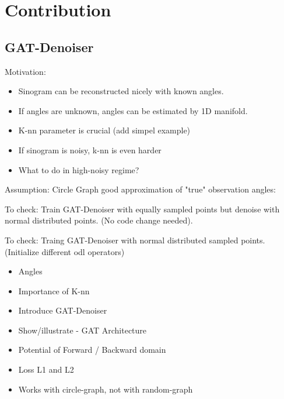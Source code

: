 \chapter{Contribution}
\label{sec:contribution}



\section{GAT-Denoiser}


Motivation:
\begin{itemize}
  \item Sinogram can be reconstructed nicely with known angles.
  \item If angles are unknown, angles can be estimated by 1D manifold.
  \item K-nn parameter is crucial (add simpel example)
  \item If sinogram is noisy, k-nn is even harder
  \item What to do in high-noisy regime?
\end{itemize}

Assumption:
Circle Graph good approximation of "true" observation angles:

To check:
Train GAT-Denoiser with equally sampled points but denoise with
normal distributed points.
(No code change needed).

To check:
Traing GAT-Denoiser with normal distributed sampled points.
(Initialize different odl operators)



\begin{itemize}
  \item Angles 
  \item Importance of K-nn 
  \item Introduce GAT-Denoiser
  \item Show/illustrate - GAT Architecture
  \item Potential of Forward / Backward domain
  \item Loss L1 and L2
  \item Works with circle-graph, not with random-graph
\end{itemize}